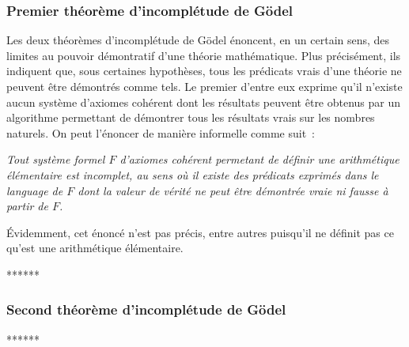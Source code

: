 \subsubsection{Premier théorème d'incomplétude de Gödel}

Les deux théorèmes d'incomplétude de Gödel énoncent, en un certain sens, des limites au pouvoir démontratif d'une théorie mathématique. 
Plus précisément, ils indiquent que, sous certaines hypothèses, tous les prédicats vrais d'une théorie ne peuvent être démontrés comme tels. 
Le premier d'entre eux exprime qu'il n'existe aucun système d'axiomes cohérent dont les résultats peuvent être obtenus par un algorithme permettant de démontrer tous les résultats vrais sur les nombres naturels. 
On peut l'énoncer de manière informelle comme suit : 

\medskip

\noindent \textit{Tout système formel $F$ d'axiomes cohérent permetant de définir une arithmétique élémentaire est incomplet, au sens où il existe des prédicats exprimés dans le language de $F$ dont la valeur de vérité ne peut être démontrée vraie ni fausse à partir de $F$.}

\medskip

\noindent Évidemment, cet énoncé n'est pas précis, entre autres puisqu'il ne définit pas ce qu'est une arithmétique élémentaire.

******

\subsubsection{Second théorème d'incomplétude de Gödel}


******
